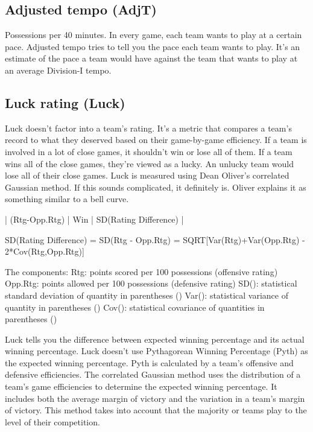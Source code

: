 \documentclass[
10pt, %
a4paper, %
oneside, %
headinclude,footinclude, %
BCOR5mm, %
]{scrartcl}
\begin{document}
\begin{description}
\subsection{Adjusted tempo (AdjT)}
\begin{description}
	Possessions per 40 minutes.
	In every game, each team wants to play at a certain pace. Adjusted tempo tries to tell you the pace each team wants to play.
	It's an estimate of the pace a team would have against the team that wants to play at an average Division-I tempo.
\end{description}

\subsection{Luck rating (Luck)}
\begin{description}
Luck doesn't factor into a team's rating. It's a metric that compares a team's record to what they deserved based on their game-by-game efficiency.
If a team is involved in a lot of close games, it shouldn't win or lose all of them. If a team wins all of the close games, they're viewed as a lucky. An unlucky team would lose all of their close games.
Luck is measured using Dean Oliver's correlated Gaussian method.
If this sounds complicated, it definitely is.
Oliver explains it as something similar to a bell curve.

            |           (Rtg-Opp.Rtg)           |
Win%
            |       SD(Rating Difference)       |

SD(Rating Difference) = SD(Rtg - Opp.Rtg)
= SQRT[Var(Rtg)+Var(Opp.Rtg) - 2*Cov(Rtg,Opp.Rtg)]

The components:
Rtg: points scored per 100 possessions (offensive rating)
Opp.Rtg: points allowed per 100 possessions (defensive rating)
SD(): statistical standard deviation of quantity in parentheses ()
Var(): statistical variance of quantity in parentheses ()
Cov(): statistical covariance of quantities in parentheses ()

Luck tells you the difference between expected winning percentage and its actual winning percentage.
Luck doesn't use Pythagorean Winning Percentage (Pyth) as the expected winning percentage. Pyth is calculated by a team's offensive and defensive efficiencies.
The correlated Gaussian method uses the distribution of a team's game efficiencies to determine the expected winning percentage. It includes both the average margin of victory and the variation in a team's margin of victory.
This method takes into account that the majority or teams play to the level of their competition.


\end{description}
\end{description}
\end{document}
